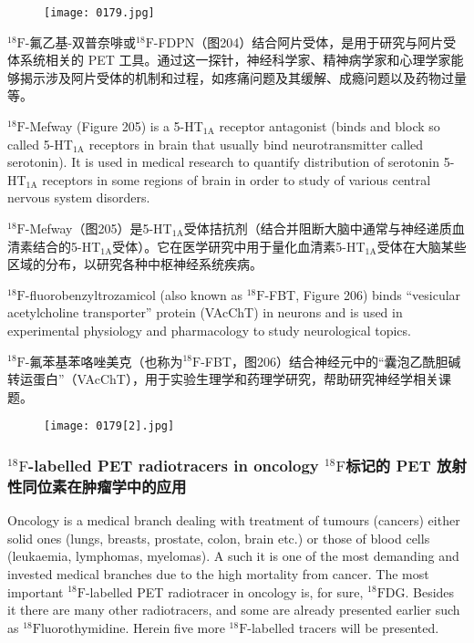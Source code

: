 \documentclass[dvipsnames, svgnames,a4paper,11pt]{article}
\begin{document}
\begin{figure}[h]
	\centering
    \texttt{[image: 0179.jpg]}   
     \label{fig205}
\end{figure}


${}^\mathrm{18}\mathrm{F}$-氟乙基-双普奈啡或${}^\mathrm{18}\mathrm{F}$-FDPN（图204）结合阿片受体，是用于研究与阿片受体系统相关的 PET 工具。通过这一探针，神经科学家、精神病学家和心理学家能够揭示涉及阿片受体的机制和过程，如疼痛问题及其缓解、成瘾问题以及药物过量等。

${}^\mathrm{18}\mathrm{F}$-Mefway (Figure 205) is a 5-HT${}_\mathrm{1A}$ receptor antagonist (binds and block so called
5-HT${}_\mathrm{1A}$ receptors in brain that usually bind neurotransmitter called serotonin). It is
used in medical research to quantify distribution of serotonin 5-HT${}_\mathrm{1A}$ receptors in
some regions of brain in order to study of various central nervous system disorders.

${}^\mathrm{18}\mathrm{F}$-Mefway（图205）是5-HT${}_\mathrm{1A}$受体拮抗剂（结合并阻断大脑中通常与神经递质血清素结合的5-HT${}_\mathrm{1A}$受体）。它在医学研究中用于量化血清素5-HT${}_\mathrm{1A}$受体在大脑某些区域的分布，以研究各种中枢神经系统疾病。

${}^\mathrm{18}\mathrm{F}$-fluorobenzyltrozamicol (also known as ${}^\mathrm{18}\mathrm{F}$-FBT, Figure 206) binds “vesicular
acetylcholine transporter” protein (VAcChT) in neurons and is used in experimental
physiology and pharmacology to study neurological topics.

${}^\mathrm{18}\mathrm{F}$-氟苯基苯咯唑美克（也称为${}^\mathrm{18}\mathrm{F}$-FBT，图206）结合神经元中的“囊泡乙酰胆碱转运蛋白”（VAcChT），用于实验生理学和药理学研究，帮助研究神经学相关课题。

\begin{figure}[h]
	\centering
    \texttt{[image: 0179[2].jpg]}   
     \label{fig206}
\end{figure}


\subsubsection{${}^\mathrm{18}\mathrm{F}$-labelled PET radiotracers in oncology ${}^\mathrm{18}\mathrm{F}$标记的 PET 放射性同位素在肿瘤学中的应用}

Oncology is a medical branch dealing with treatment of tumours (cancers) either
solid ones (lungs, breasts, prostate, colon, brain etc.) or those of blood cells
(leukaemia, lymphomas, myelomas). A such it is one of the most demanding and
invested medical branches due to the high mortality from cancer. The most important
${}^\mathrm{18}\mathrm{F}$-labelled PET radiotracer in oncology is, for sure, ${}^\mathrm{18}\mathrm{F}$DG. Besides it there are
many other radiotracers, and some are already presented earlier such as
${}^\mathrm{18}\mathrm{F}$luorothymidine. Herein five more ${}^\mathrm{18}\mathrm{F}$-labelled tracers will be presented.
\end{document}
